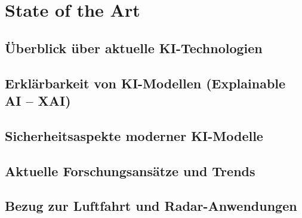 \part{State of the Art}
\chapter{Überblick über aktuelle KI-Technologien}

\chapter{Erklärbarkeit von KI-Modellen (Explainable AI – XAI)}

\chapter{Sicherheitsaspekte moderner KI-Modelle}

\chapter{Aktuelle Forschungsansätze und Trends}

\chapter{Bezug zur Luftfahrt und Radar-Anwendungen}